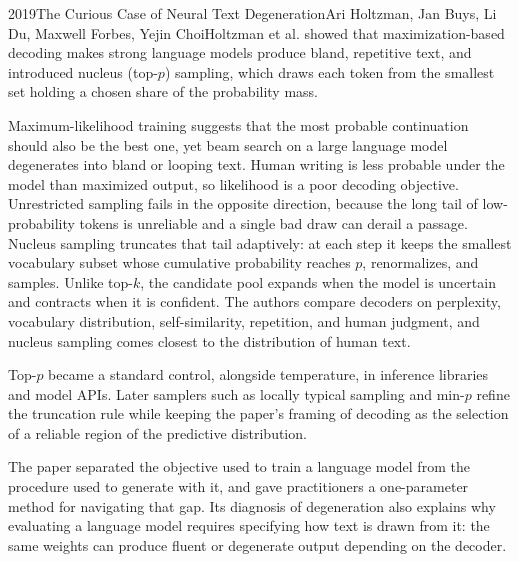 
\begin{papersummary}{2019}{The Curious Case of Neural Text Degeneration}{Ari Holtzman, Jan Buys, Li Du, Maxwell Forbes, Yejin Choi}{Holtzman et al. showed that maximization-based decoding makes strong language models produce bland, repetitive text, and introduced nucleus (top-$p$) sampling, which draws each token from the smallest set holding a chosen share of the probability mass.}

Maximum-likelihood training suggests that the most probable continuation should also be the best one, yet beam search on a large language model degenerates into bland or looping text. Human writing is less probable under the model than maximized output, so likelihood is a poor decoding objective. Unrestricted sampling fails in the opposite direction, because the long tail of low-probability tokens is unreliable and a single bad draw can derail a passage. Nucleus sampling truncates that tail adaptively: at each step it keeps the smallest vocabulary subset whose cumulative probability reaches $p$, renormalizes, and samples. Unlike top-$k$, the candidate pool expands when the model is uncertain and contracts when it is confident. The authors compare decoders on perplexity, vocabulary distribution, self-similarity, repetition, and human judgment, and nucleus sampling comes closest to the distribution of human text.

Top-$p$ became a standard control, alongside temperature, in inference libraries and model APIs. Later samplers such as locally typical sampling and min-$p$ refine the truncation rule while keeping the paper's framing of decoding as the selection of a reliable region of the predictive distribution.

The paper separated the objective used to train a language model from the procedure used to generate with it, and gave practitioners a one-parameter method for navigating that gap. Its diagnosis of degeneration also explains why evaluating a language model requires specifying how text is drawn from it: the same weights can produce fluent or degenerate output depending on the decoder.

\end{papersummary}
